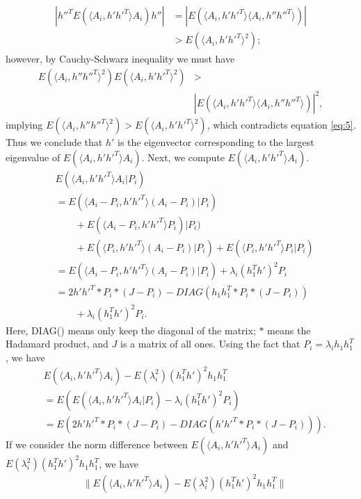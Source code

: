 \documentclass[10pt,journal,compsoc]{IEEEtran}
\newenvironment{proof}[1][Proof]{\begin{trivlist}
		\item[\hskip \labelsep {\bfseries #1}]}{\end{trivlist}}
\begin{document}
\begin{proof} [Proof of Theorem 4.2]
	\begin{align*}  | h''^T E(\langle A_{i},h' h'^T \rangle A_{i}) h''| &= |E(\langle A_{i},h' h'^T \rangle \langle A_{i},h'' h''^T \rangle)| \\
	&> E(\langle A_{i},h' h'^T \rangle ^2);
	\end{align*}
	however, by Cauchy-Schwarz inequality we must have
	\begin{align*} E(\langle A_{i},h'' h''^T \rangle^2)  E(\langle A_{i},h' h'^T \rangle^2) &> \\
	&|E(\langle A_{i},h' h'^T \rangle \langle A_{i},h'' h''^T \rangle)|^2,
	\end{align*}
	implying $E(\langle A_{i},h'' h''^T \rangle^2) > E(\langle A_{i},h' h'^T \rangle^2)$, which contradicts equation \eqref{eq:5}. Thus we conclude that $h'$ is the eigenvector corresponding to the largest eigenvalue of $E(\langle A_{i},h' h'^T \rangle A_{i})$. Next, we compute $E(\langle A_{i},h' h'^T \rangle A_{i})$.
	\begin{align*}
	&E(\langle A_{i},h' h'^T \rangle A_{i}|P_i)    \\
	&=E( \langle A_{i}-P_i,h' h'^T \rangle (A_{i}-P_i)|P_i)\\
	&\qquad {}+E(\langle A_{i}-P_i,h' h'^T \rangle P_i)|P_i) \\
	&\qquad {} +E(\langle P_i,h' h'^T \rangle (A_{i}-P_i)|P_i)+E(\langle P_i,h' h'^T \rangle P_i|P_i) \\
	&= E(\langle A_{i}-P_i,h' h'^T \rangle (A_{i}-P_i)|P_i) + \lambda_i (h_1^Th')^2 P_i \\
	&=  2h' h'^T *P_i*(J-P_i) - DIAG(h_1 h_1^T *P_i*(J-P_i)) 	\\
	&\qquad {}+\lambda_i (h_1^Th')^2 P_i .
	\end{align*}
	Here, DIAG() means only keep the diagonal of the matrix; $*$ means the Hadamard product, and $J$ is a matrix of all ones. Using the fact that $P_i=\lambda_i h_1 h_1 ^T$, we have 
	\begin{align*}
	&E(\langle A_{i},h' h'^T \rangle A_{i}) - E(\lambda_i^2) (h_1^Th')^2 h_1 h_1^T \\
	&=E(E(\langle A_{i},h' h'^T \rangle A_{i}|P_i)-\lambda_i (h_1^Th')^2 P_i) 
	 \\
	&= E(2 h' h'^T *P_i*(J-P_i) - DIAG(h' h'^T*P_i*(J-P_i))).
	\end{align*}
	If we consider the norm difference between $E( \langle A_{i},h' h'^T \rangle A_{i})$ and $ E(\lambda_i^2) (h_1^Th')^2 h_1 h_1^T$, we have
	\begin{align*}
	&\|E(\langle A_{i},h' h'^T \rangle A_{i} ) - E(\lambda_i^2) (h_1^Th')^2 h_1 h_1^T\| \\

\end{align*}
\end{proof}
\end{document}
